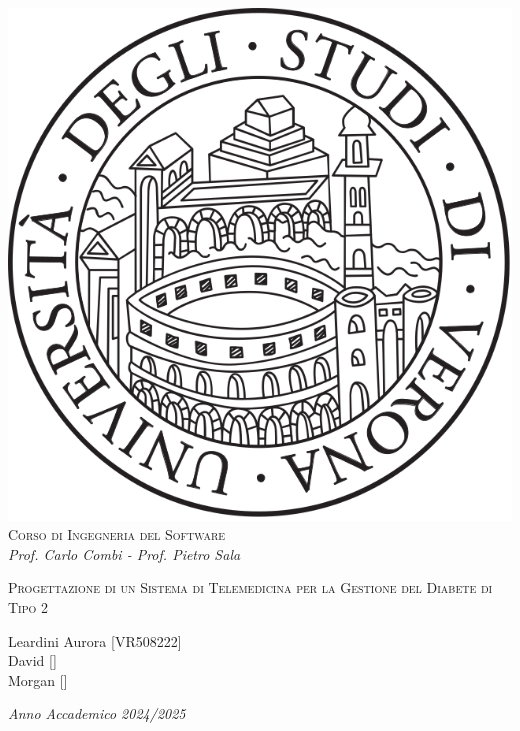 \begin{titlepage}
\begin{center}
\begin{spacing}{1.5}
\includegraphics[width=.2\textwidth, height=.2\textheight, keepaspectratio]{figures/verona.png}\\
{{\Large{\textsc{Corso di Ingegneria del Software}}}}\\
{\large{\it Prof. Carlo Combi - Prof. Pietro Sala}}
\end{spacing}
\end{center}
\vspace{15mm}
\begin{center}
\begin{spacing}{1.5}
    
{\large }

{\LARGE{\textsc{Progettazione di un Sistema di Telemedicina per la Gestione del Diabete di Tipo 2}}}\\
\begin{center}
\vspace{35mm}
{\large{\textsc Leardini Aurora [VR508222] \\David [] \\Morgan []}}
\end{center}
\end{spacing}
\end{center}
\par
\noindent
\vspace{45mm}
\begin{center}
{\large{\it Anno Accademico 2024/2025 }}
\end{center}
\end{titlepage}